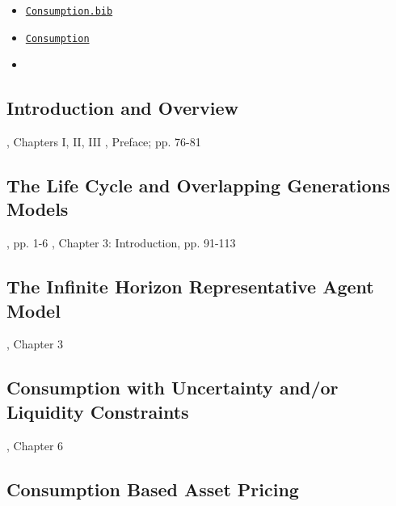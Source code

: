 
\begin{itemize}
\item[Bib:] \texttt{\href{https://ccarrollatjhuecon.github.io/Choice/Syllabus/Consumption.bib}{Consumption.bib}}
\item[Handouts:] \texttt{\href{https://intertemporal-choice.github.io/content/consumption}{Consumption}}
\item[Readings:]
\end{itemize}

\newcommand{\IntroC}{Introduction and Overview}
\subsection{\IntroC}\label{subsec:\IntroC}

\newcommand{\dt}{\cite{deatonUnderstandingC}}
\newcommand{\fr}{\cite{friedmanATheory}}
\bi
\reqd \fr, Chapters I, II, III
\reqd \dt, Preface; pp. 76-81
\ei

\subsection{The Life Cycle and Overlapping Generations Models}

\providecommand{\blf}{\cite{blanchard&fischer:text}}
\providecommand{\ro}{\cite{romer:text}}
\bi
\reqd \dt, pp. 1-6
\reqd \blf, Chapter 3: Introduction, pp. 91-113
\recm \cite{diamond:olg}
\recm \cite{feldstein:induced}
\reqd \cite{modigliani:nobel}
\recm \cite{summersCapTax}
\recm \cite{pemberton:failure}
\reqd \cite{carroll&summers:cparallelsy}
\ei

\subsection{The Infinite Horizon Representative Agent Model}

\bi
\reqd \dt, Chapter 3
\reqd \cite{hallRandomWalk}
\recm \cite{flavinSensitive}
\recm \cite{cdSmooth}
\reqd \cite{cmModel}
\recm \cite{hallSubstitution}
\recm \cite{cfwSentiment}
\ei

\subsection{Consumption with Uncertainty and/or Liquidity Constraints}

\bi
\reqd \dt, Chapter 6
\recm \cite{zeldes_jpe89}
\recm \cite{caballero:jme}
\recm \cite{deatonLiqConstr}
\recm \cite{toche:urisk}
\reqd \cite{carroll:atheorynberwp}
\reqd \cite{CarrollKimballPSPW}
\reqd \cite{carroll&summers:cparallelsy}
\recm \cite{BufferStockTheory}
\recm \cite{carroll:death}
\ei

\subsection{Consumption Based Asset Pricing}

\bi
\reqd \cite{lucas:assetpricing}
\reqd \cite{mehraPrescottPuzzle}
\recm \cite{blanchard:burstingbubbles}
\recm \cite{carrollIrrational}
\ei
